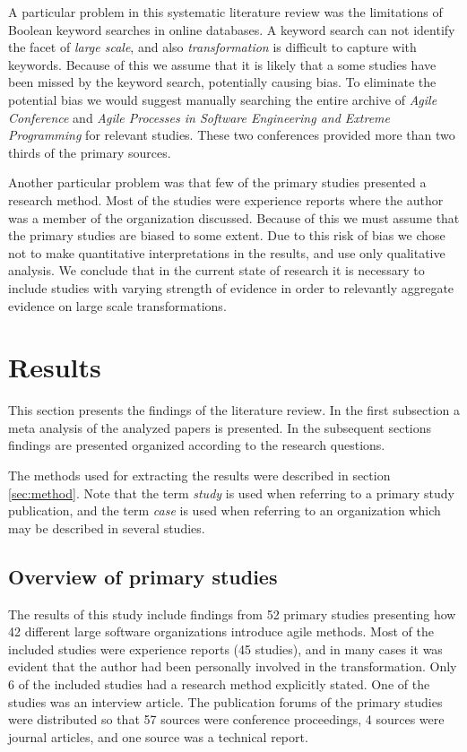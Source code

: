 \documentclass[preprint,authoryear,12pt]{elsarticle}
\begin{document}
A particular problem in this systematic literature review was the limitations of
Boolean keyword searches in online databases. A keyword search can not identify
the facet of \emph{large scale}, and also \emph{transformation} is difficult to
capture with keywords. Because of this we assume that it is likely that a some
studies have been missed by the keyword search, potentially causing bias. To
eliminate the potential bias we would suggest manually searching the entire
archive of \emph{Agile Conference} and \emph{Agile Processes in Software
Engineering and Extreme Programming} for relevant studies. These two conferences
provided more than two thirds of the primary sources.

Another particular problem was that few of the primary studies presented a
research method. Most of the studies were experience reports where the author
was a member of the organization discussed. Because of this we must assume that
the primary studies are biased to some extent. Due to this risk of bias we chose
not to make quantitative interpretations in the results, and use only
qualitative analysis. We conclude that in the current state of research it is
necessary to include studies with varying strength of evidence in order to
relevantly aggregate evidence on large scale transformations.


\clearpage

\section{Results}
\label{sec:results}

This section presents the findings of the literature review. In the first
subsection a meta analysis of the analyzed papers is presented. In the
subsequent sections findings are presented organized according to the research
questions.

The methods used for extracting the results were described in section
\ref{sec:method}. Note that the term \emph{study} is used when referring to a
primary study publication, and the term \emph{case} is used when referring to an
organization which may be described in several studies.

\subsection{Overview of primary studies}

The results of this study include findings from 52 primary studies presenting
how 42 different large software organizations introduce agile methods. Most of
the included studies were experience reports (45 studies), and in many cases it
was evident that the author had been personally involved in the transformation.
Only 6 of the included studies had a research method explicitly stated. One of
the studies was an interview article. The publication forums of the primary
studies were distributed so that 57 sources were conference proceedings, 4
sources were journal articles, and one source was a technical report.
\end{document}
